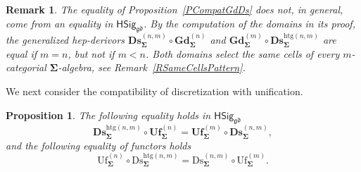 \documentclass[a4paper, reqno]{amsbook}
\newcommand{\sig}[1]{\mathbf{#1}}             %
\newcommand{\gd}{\mathfrak{gd}}              %
\newcommand{\htg}{\mathrm{htg}}                %
\newcommand{\Uf}{\mathrm{Uf}}
\newcommand{\Ds}{\mathrm{Ds}}
\newcommand{\bGd}{\mathbf{Gd}}
\newcommand{\bUf}{\mathbf{Uf}}
\newcommand{\bDs}{\mathbf{Ds}}
\theoremstyle{plain}
\newtheorem{proposition}[theorem]{Proposition}
\newtheorem{remark}[theorem]{Remark}
\theoremstyle{definition}
\begin{document}
\begin{remark}\label{RCompatGdDsDerivors}
The equality of Proposition~\ref{PCompatGdDs} does not, in general, come from an equality in $\mathsf{HSig}_{\gd}$.
By the computation of the domains in its proof, the generalized hep-derivors $\bDs^{(n,m)}_{\sig{\Sigma}}\circ\bGd^{(n)}_{\sig{\Sigma}}$ and $\bGd^{(m)}_{\sig{\Sigma}}\circ\bDs^{\htg(n,m)}_{\sig{\Sigma}}$ are equal if $m=n$, but not if $m<n$.
Both domains select the same cells of every $m$-categorial $\sig{\Sigma}$-algebra, see Remark~\ref{RSameCellsPattern}.
\end{remark}

We next consider the compatibility of discretization with unification.

\begin{proposition}\label{PCompatUfDs}
The following equality holds in $\mathsf{HSig}_{\gd}$
$$
\bDs^{\htg(n,m)}_{\sig{\Sigma}}\circ\bUf^{(n)}_{\sig{\Sigma}}=\bUf^{(m)}_{\sig{\Sigma}}\circ\bDs^{(n,m)}_{\sig{\Sigma}},
$$
and the following equality of functors holds
$$
\Uf^{(n)}_{\sig{\Sigma}}\circ\Ds^{\htg(n,m)}_{\sig{\Sigma}}=\Ds^{(n,m)}_{\sig{\Sigma}}\circ\Uf^{(m)}_{\sig{\Sigma}}.
$$
\end{proposition}
\end{document}

